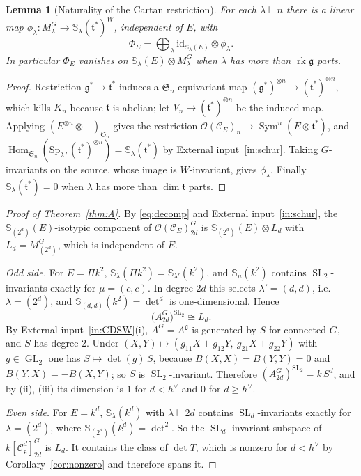 \documentclass[11pt]{article}
\newtheorem{lemma}[theorem]{Lemma}
\theoremstyle{definition}
\newcommand{\g}{\mathfrak g}
\newcommand{\h}{\mathfrak t}
\newcommand{\Cs}{\mathcal C}
\newcommand{\Oo}{\mathcal O}
\newcommand{\rk}{\operatorname{rk}}
\newcommand{\Sf}{\mathbb S}
\newcommand{\hv}{h^\vee}
\newcommand{\Sg}{\mathfrak S}
\DeclareMathOperator{\Sym}{Sym}
\DeclareMathOperator{\Hom}{Hom}
\DeclareMathOperator{\GL}{GL}
\DeclareMathOperator{\SL}{SL}
\begin{document}
\begin{lemma}[Naturality of the Cartan restriction]\label{lem:natural}
For each $\lambda\vdash n$ there is a linear map $\phi_\lambda:M^G_\lambda\to\Sf_\lambda(\h^*)^W$, independent of $E$, with
\[
\Phi_E=\bigoplus_{\lambda}\mathrm{id}_{\Sf_\lambda(E)}\otimes\phi_\lambda .
\]
In particular $\Phi_E$ vanishes on $\Sf_\lambda(E)\otimes M^G_\lambda$ when $\lambda$ has more than $\rk\g$ parts.
\end{lemma}
\begin{proof}
Restriction $\g^*\to\h^*$ induces a $\Sg_n$-equivariant map $(\g^*)^{\otimes n}\to(\h^*)^{\otimes n}$, which kills $K_n$ because $\h$ is abelian; let $V_n\to(\h^*)^{\otimes n}$ be the induced map. Applying $(E^{\otimes n}\otimes-)_{\Sg_n}$ gives the restriction $\Oo(\Cs_E)_n\to\Sym^n(E\otimes\h^*)$, and $\Hom_{\Sg_n}(\mathrm{Sp}_\lambda,(\h^*)^{\otimes n})=\Sf_\lambda(\h^*)$ by External input~\ref{in:schur}. Taking $G$-invariants on the source, whose image is $W$-invariant, gives $\phi_\lambda$. Finally $\Sf_\lambda(\h^*)=0$ when $\lambda$ has more than $\dim\h$ parts.
\end{proof}

\begin{proof}[Proof of Theorem~\ref{thm:A}]
By \eqref{eq:decomp} and External input~\ref{in:schur}, the $\Sf_{(2^d)}(E)$-isotypic component of $\Oo(\Cs_E)^G_{2d}$ is $\Sf_{(2^d)}(E)\otimes L_d$ with $L_d=M^G_{(2^d)}$, which is independent of $E$.

\emph{Odd side.} For $E=\Pi k^2$, $\Sf_\lambda(\Pi k^2)=\Sf_{\lambda'}(k^2)$, and $\Sf_\mu(k^2)$ contains $\SL_2$-invariants exactly for $\mu=(c,c)$. In degree $2d$ this selects $\lambda'=(d,d)$, i.e.\ $\lambda=(2^d)$, and $\Sf_{(d,d)}(k^2)=\det^d$ is one-dimensional. Hence
\[
\bigl(A^G_{2d}\bigr)^{\SL_2}\cong L_d .
\]
By External input~\ref{in:CDSW}(i), $A^G=A^\g$ is generated by $S$ for connected $G$, and $S$ has degree $2$. Under $(X,Y)\mapsto(g_{11}X+g_{12}Y,\ g_{21}X+g_{22}Y)$ with $g\in\GL_2$ one has $S\mapsto\det(g)\,S$, because $B(X,X)=B(Y,Y)=0$ and $B(Y,X)=-B(X,Y)$; so $S$ is $\SL_2$-invariant. Therefore $(A^G_{2d})^{\SL_2}=k\,S^d$, and by (ii), (iii) its dimension is $1$ for $d<\hv$ and $0$ for $d\ge\hv$.

\emph{Even side.} For $E=k^d$, $\Sf_\lambda(k^d)$ with $\lambda\vdash2d$ contains $\SL_d$-invariants exactly for $\lambda=(2^d)$, where $\Sf_{(2^d)}(k^d)=\det^2$. So the $\SL_d$-invariant subspace of $k[\Cs^d_\g]^G_{2d}$ is $L_d$. It contains the class of $\det T$, which is nonzero for $d<\hv$ by Corollary~\ref{cor:nonzero} and therefore spans it.
\end{proof}
\end{document}
